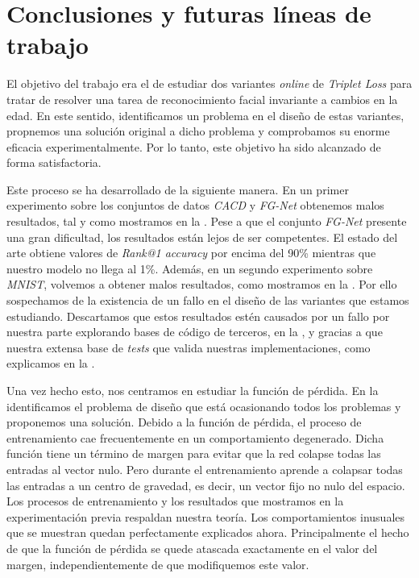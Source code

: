 \chapter{Conclusiones y futuras líneas de trabajo} \label{ich:conclusiones}

El objetivo del trabajo era el de estudiar dos variantes \textit{online} de \textit{Triplet Loss} para tratar de resolver una tarea de reconocimiento facial invariante a cambios en la edad. En este sentido, identificamos un problema en el diseño de estas variantes, propnemos una solución original a dicho problema y comprobamos su enorme eficacia experimentalmente. Por lo tanto, este objetivo ha sido alcanzado de forma satisfactoria.

Este proceso se ha desarrollado de la siguiente manera. En un primer experimento sobre los conjuntos de datos \textit{CACD} y \textit{FG-Net} obtenemos malos resultados, tal y como mostramos en la . Pese a que el conjunto \textit{FG-Net} presente una gran dificultad, los resultados están lejos de ser competentes. El estado del arte obtiene valores de \textit{Rank@1 accuracy} por encima del 90\% mientras que nuestro modelo no llega al 1\%. Además, en un segundo experimento sobre \textit{MNIST}, volvemos a obtener malos resultados, como mostramos en la . Por ello sospechamos de la existencia de un fallo en el diseño de las variantes que estamos estudiando. Descartamos que estos resultados estén causados por un fallo por nuestra parte explorando bases de código de terceros, en la , y gracias a que nuestra extensa base de \textit{tests} que valida nuestras implementaciones, como explicamos en la .

Una vez hecho esto, nos centramos en estudiar la función de pérdida. En la  identificamos el problema de diseño que está ocasionando todos los problemas y proponemos una solución. Debido a la función de pérdida, el proceso de entrenamiento cae frecuentemente en un comportamiento degenerado. Dicha función tiene un término de margen para evitar que la red colapse todas las entradas al vector nulo. Pero durante el entrenamiento aprende a colapsar todas las entradas a un centro de gravedad, es decir, un vector fijo no nulo del espacio. Los procesos de entrenamiento y los resultados que mostramos en la experimentación previa respaldan nuestra teoría. Los comportamientos inusuales que se muestran quedan perfectamente explicados ahora. Principalmente el hecho de que la función de pérdida se quede atascada exactamente en el valor del margen, independientemente de que modifiquemos este valor.

